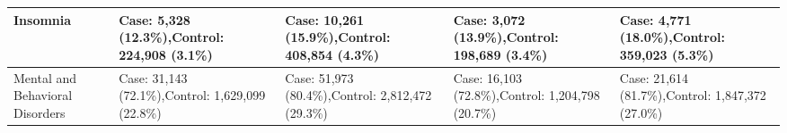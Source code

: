 \documentclass[12pt]{article}
\begin{document}
\begin{table}[!ht]
\begin{tabular}{
  |L{0.81in}|L{1.41in}|L{1.41in}|L{1.41in}|L{1.41in}|
}
Insomnia &
Case: 5,328 (12.3\%),\newline Control: 224,908 (3.1\%) &
Case: 10,261 (15.9\%),\newline Control: 408,854 (4.3\%) &
Case: 3,072 (13.9\%),\newline Control: 198,689 (3.4\%) &
Case: 4,771 (18.0\%),\newline Control: 359,023 (5.3\%) \\
\hline

Mental and Behavioral Disorders &
Case: 31,143 (72.1\%),\newline Control: 1,629,099 (22.8\%) &
Case: 51,973 (80.4\%),\newline Control: 2,812,472 (29.3\%) &
Case: 16,103 (72.8\%),\newline Control: 1,204,798 (20.7\%) &
Case: 21,614 (81.7\%),\newline Control: 1,847,372 (27.0\%) \\
\hline

\end{tabular}
\end{table}
\end{document}
